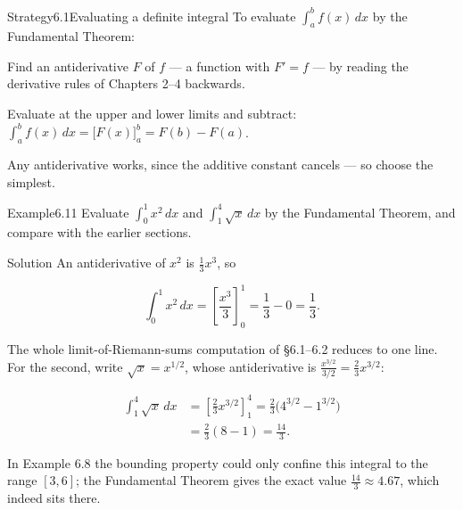 \documentclass[a4paper,12pt,oneside]{memoir}
\begin{document}
\begin{envstrategy}{Strategy}{6.1}{Evaluating a definite integral}
To evaluate \(\displaystyle\int_{a}^{b} f(x)\,dx\) by the Fundamental Theorem:

\begin{steps}
  \item Find an antiderivative \(F\) of \(f\) — a function with \(F' = f\) — by reading the derivative rules of Chapters 2–4 backwards.
  \item Evaluate at the upper and lower limits and subtract: \(\displaystyle\int_{a}^{b} f(x)\,dx = \bigl[F(x)\bigr]_{a}^{b} = F(b) - F(a)\).
  \item Any antiderivative works, since the additive constant cancels — so choose the simplest.
\end{steps}
\end{envstrategy}
\begin{workedexample}
\begin{envexample}{Example}{6.11}{}
Evaluate \(\displaystyle\int_{0}^{1} x^{2}\,dx\) and \(\displaystyle\int_{1}^{4} \sqrt{x}\,dx\) by the Fundamental Theorem, and compare with the earlier sections.
\end{envexample}
\begin{envsolution}{Solution}{}{}
An antiderivative of \(x^{2}\) is \(\tfrac{1}{3}x^{3}\), so

\[ \int_{0}^{1} x^{2}\,dx = \left[\frac{x^{3}}{3}\right]_{0}^{1} = \frac{1}{3} - 0 = \frac{1}{3}. \]

The whole limit-of-Riemann-sums computation of §6.1–6.2 reduces to one line. For the second, write \(\sqrt{x} = x^{1/2}\), whose antiderivative is \(\tfrac{x^{3/2}}{3/2} = \tfrac{2}{3}x^{3/2}\):

\[ \begin{aligned}
          \int_{1}^{4} \sqrt{x}\,dx &= \left[\frac{2}{3}x^{3/2}\right]_{1}^{4}
                                     = \frac{2}{3}\bigl(4^{3/2} - 1^{3/2}\bigr) \\[2pt]
                                    &= \frac{2}{3}(8 - 1) = \frac{14}{3}.
        \end{aligned} \]

In Example 6.8 the bounding property could only confine this integral to the range \([3, 6]\); the Fundamental Theorem gives the exact value \(\tfrac{14}{3} \approx 4.67\), which indeed sits there. \qedmark
\end{envsolution}
\end{workedexample}
\end{document}
